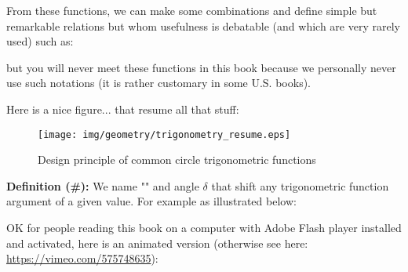 	From these functions, we can make some combinations and define simple but remarkable relations but whom usefulness is debatable (and which are very rarely used) such as:
	
	but you will never meet these functions in this book because we personally never use such notations (it is rather customary in some U.S. books).
	
	Here is a nice figure... that resume all that stuff:
	
	\begin{figure}[H]
	\centering
	\texttt{[image: img/geometry/trigonometry\_resume.eps]}
	\caption{Design principle of common circle trigonometric functions}
	\end{figure}
	
	\textbf{Definition (\#\mydef):} We name "" and angle $\delta$ that shift any trigonometric function argument of a given value. For example as illustrated below:
	
	\begin{figure}[H]
	\centering
	\end{figure}
	
	OK for people reading this book on a computer with Adobe Flash player installed and activated, here is an animated version (otherwise see here: \url{https://vimeo.com/575748635}):
	
	\begin{center}
	\centering
	\end{center}

